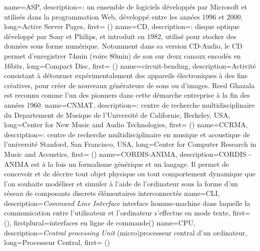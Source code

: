 {
    name={ASP},
    description={\textit{}: un ensemble de logiciels développés par Microsoft et utilisés dans la programmation Web, développé entre les années 1996 et 2000},
    long={Active Server Pages},
    first={ ()}
}
{
    name={CD},
    description={\textit{}: disque optique développé par Sony et Philips, et introduit en 1982, utilisé pour stocker des données sous forme numérique. Notamment dans sa version CD-Audio, le CD permet d'enregistrer 74min (voire 80min) de son sur deux canaux encodés en 16bits},
    long={Compact Disc},
    first={ ()}
}
{
    name={circuit-bending},
    description={Activité consistant à détourner expérimentalement des appareils électroniques à des fins créatives, pour créer de nouveaux générateurs de sons ou d'images. Reed Ghazala est reconnu comme l'un des pionners dans cette démarche entreprise à la fin des années 1960.}
}
{
    name={CNMAT},
    description={\textit{}: centre de recherche multidisciplinaire du Departement de Musique de l'Université de Californie, Berkeley, USA},
    long={Center for New Music and Audio Technologies},
    first={ ()}
}
{
    name={CCRMA},
    description={\textit{}: centre de recherche multidisciplinaire en musique et acoustique de l'université Stanford, San Francisco, USA},
    long={Center for Computer Research in Music and Acoustics},
    first={ ()}
}
{
    name={CORDIS-ANIMA},
    description={CORDIS - ANIMA est à la fois un formalisme générique et un langage. Il permet de concevoir et de décrire tout objet physique ou tout comportement dynamique que l'on souhaite modéliser et simuler à l'aide de l'ordinateur sous la forme d'un réseau de composants discrets élémentaires interconnectés}
}
{
    name={CLI},
    description={\textit{Command Line Interface} interface homme-machine dans laquelle la communication entre l'utilisateur et l'ordinateur s'effectue en mode texte},
    first={ ()},
    firstplural={interfaces en ligne de commande(\glspluralsuffix)}
}
{
    name={CPU},
    description={\textit{Central processing Unit} (micro)processeur central d'un ordinateur},
    long={Processeur Central},
    first={ ()}
}
